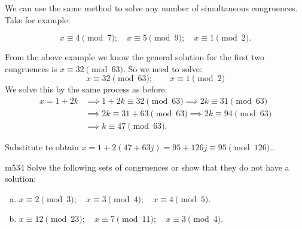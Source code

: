 We can use the same method to solve any number of simultaneous congruences. Take for example:

\[x \equiv 4 \pmod 7; \quad x \equiv 5 \pmod 9; \quad x \equiv 1 \pmod 2.\]

From the above example we know the general solution for the first two congruences  is $x \equiv 32 \pmod {63}$.  So we need to solve:
\[x \equiv 32 \pmod {63}; \qquad x \equiv 1 \pmod 2\]
We solve this by the same process as before: 
\begin{align*}
x = 1 + 2k &\implies 1 + 2k \equiv 32 \pmod {63} \implies 2k \equiv 31 \pmod {63}\\
&\implies 2k \equiv 31+63 \pmod {63} \implies 2k \equiv 94 \pmod {63} \\
&\implies k \equiv 47 \pmod {63}.
\end{align*}

Substitute to obtain $x = 1 + 2(47+ 63j) = 95 + 126j \equiv 95 \pmod{126}.$.  


\begin{exercise}{m534}
Solve the following sets of congruences or show that they do not have a solution:
\begin{enumerate}[(a)]
\item
$x \equiv 2 \pmod{3}; \quad x \equiv 3 \pmod{4}; \quad x \equiv 4 \pmod{5}.$
\item
$x \equiv 12 \pmod{23}; \quad x \equiv 7 \pmod{11}; \quad x \equiv 3 \pmod{4}.$
\end {enumerate}
\end {exercise}






